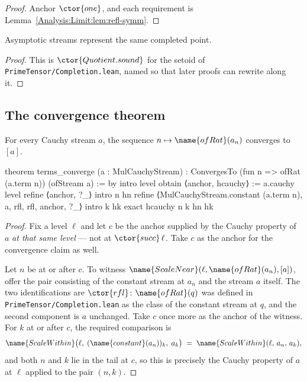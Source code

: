 \begin{proof}
Anchor $\ctor{one}$, and each requirement is
Lemma~\ref{Analysis:Limit:lem:refl-symm}.
\end{proof}

\begin{lemma}
\label{Analysis:Limit:lem:sound}
Asymptotic streams represent the same completed point.
\end{lemma}

\begin{proof}
This is $\ctor{Quotient.sound}$ for the setoid of
\texttt{PrimeTensor/Completion.lean}, named so that later proofs can rewrite
along it.
\end{proof}

\subsection{The convergence theorem}

\begin{theorem}\label{Analysis:Limit:thm:main}
For every Cauchy stream $a$, the sequence $n \mapsto \name{ofRat}(a_n)$
converges to $[a]$.
\end{theorem}

\begin{leancode}
theorem terms_converge (a : MulCauchyStream) :
    ConvergesTo (fun n => ofRat (a.term n)) (ofStream a) := by
  intro level
  obtain ⟨anchor, hcauchy⟩ := a.cauchy level
  refine ⟨anchor, ?_⟩
  intro n hn
  refine ⟨MulCauchyStream.constant (a.term n), a, rfl, rfl, anchor, ?_⟩
  intro k hk
  exact hcauchy n k hn hk
\end{leancode}

\begin{proof}
Fix a level $\ell$ and let $c$ be the anchor supplied by the Cauchy property of
$a$ \emph{at that same level} --- not at $\ctor{succ}\,\ell$.  Take $c$ as the
anchor for the convergence claim as well.

Let $n$ be at or after $c$.  To witness
$\name{ScaleNear}(\ell, \name{ofRat}(a_n), [a])$, offer the pair consisting of
the constant stream at $a_n$ and the stream $a$ itself.  The two
identifications are $\ctor{rfl}$: $\name{ofRat}(q)$ was defined in
\texttt{PrimeTensor/Completion.lean} as the class of the constant stream at
$q$, and the second component is $a$ unchanged.  Take $c$ once more as the
anchor of the witness.  For $k$ at or after $c$, the required comparison is
\[
  \name{ScaleWithin}\bigl(\ell,\; (\name{constant}(a_n))_k,\; a_k\bigr)
  \;=\;
  \name{ScaleWithin}(\ell,\, a_n,\, a_k),
\]
and both $n$ and $k$ lie in the tail at $c$, so this is precisely the Cauchy
property of $a$ at $\ell$ applied to the pair $(n,k)$.
\end{proof}

